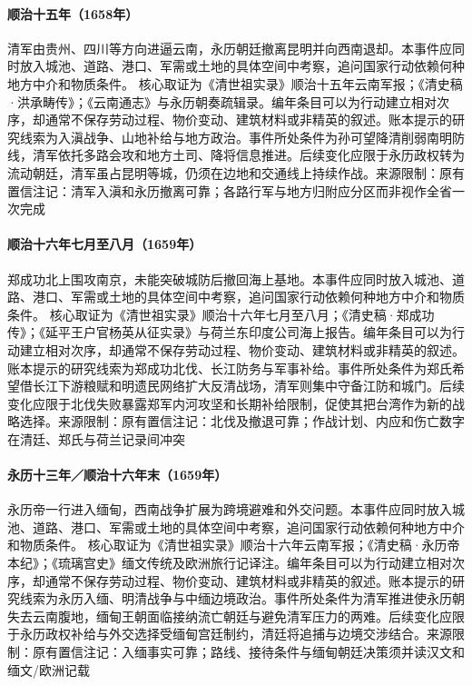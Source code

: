\hypertarget{civic:EQ-1658-QING-YUNNAN}{}\paragraph{顺治十五年（1658年）}清军由贵州、四川等方向进逼云南，永历朝廷撤离昆明并向西南退却。本事件应同时放入城池、道路、港口、军需或土地的具体空间中考察，追问国家行动依赖何种地方中介和物质条件。 核心取证为《清世祖实录》顺治十五年云南军报；《清史稿·洪承畴传》；《云南通志》与永历朝奏疏辑录。编年条目可以为行动建立相对次序，却通常不保存劳动过程、物价变动、建筑材料或非精英的叙述。账本提示的研究线索为入滇战争、山地补给与地方政治。事件所处条件为孙可望降清削弱南明防线，清军依托多路会攻和地方土司、降将信息推进。后续变化应限于永历政权转为流动朝廷，清军虽占昆明等城，仍须在边地和交通线上持续作战。来源限制：原有置信注记：清军入滇和永历撤离可靠；各路行军与地方归附应分区而非视作全省一次完成
\hypertarget{civic:EQ-1659-NANJING-EXPEDITION}{}\paragraph{顺治十六年七月至八月（1659年）}郑成功北上围攻南京，未能突破城防后撤回海上基地。本事件应同时放入城池、道路、港口、军需或土地的具体空间中考察，追问国家行动依赖何种地方中介和物质条件。 核心取证为《清世祖实录》顺治十六年七月至八月；《清史稿·郑成功传》；《延平王户官杨英从征实录》与荷兰东印度公司海上报告。编年条目可以为行动建立相对次序，却通常不保存劳动过程、物价变动、建筑材料或非精英的叙述。账本提示的研究线索为郑成功北伐、长江防务与军事补给。事件所处条件为郑氏希望借长江下游粮赋和明遗民网络扩大反清战场，清军则集中守备江防和城门。后续变化应限于北伐失败暴露郑军内河攻坚和长期补给限制，促使其把台湾作为新的战略选择。来源限制：原有置信注记：北伐及撤退可靠；作战计划、内应和伤亡数字在清廷、郑氏与荷兰记录间冲突
\hypertarget{civic:EQ-1659-YONGLI-MYANMAR}{}\paragraph{永历十三年／顺治十六年末（1659年）}永历帝一行进入缅甸，西南战争扩展为跨境避难和外交问题。本事件应同时放入城池、道路、港口、军需或土地的具体空间中考察，追问国家行动依赖何种地方中介和物质条件。 核心取证为《清世祖实录》顺治十六年云南军报；《清史稿·永历帝本纪》；《琉璃宫史》缅文传统及欧洲旅行记译注。编年条目可以为行动建立相对次序，却通常不保存劳动过程、物价变动、建筑材料或非精英的叙述。账本提示的研究线索为永历入缅、明清战争与中缅边境政治。事件所处条件为清军推进使永历朝失去云南腹地，缅甸王朝面临接纳流亡朝廷与避免清军压力的两难。后续变化应限于永历政权补给与外交选择受缅甸宫廷制约，清廷将追捕与边境交涉结合。来源限制：原有置信注记：入缅事实可靠；路线、接待条件与缅甸朝廷决策须并读汉文和缅文/欧洲记载
